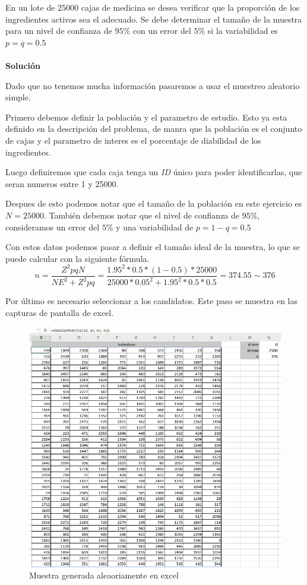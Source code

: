 \documentclass[12pt]{article}
\begin{document}
	\par En un lote de $25000$ cajas de medicina se desea verificar que la proporción de los ingredientes activos sea el adecuado. Se debe determinar el tamaño de la muestra para un nivel de confianza de $95\%$ con un error del $5\%$ si la variabilidad es $p = q = 0.5$
	\ \\\ \\\noindent \textbf{Solución}
	\par Dado que no tenemos mucha informaci\'on pasaremos a usar el muestreo aleatorio simple.
	\par Primero debemos definir la poblaci\'on y el parametro de estudio. Esto ya esta definido en la descripci\'on del problema, de manra que la poblaci\'on es el conjunto de cajas y el parametro de interes es el porcentaje de diabilidad de los ingredientes.
	\par Luego definiremos que cada caja tenga un \textit{ID} \'unico para poder identificarlas, que seran numeros entre 1 y 25000.
	\par Despues de esto podemos notar que el tama\~no de la poblaci\'on en este ejercicio es $N=25000$. Tambi\'en debemos notar que el nivel de confianza de $95\%$, consideramos un error del $5\%$ y una variabilidad de $p = 1-q = 0.5$
	\par Con estos datos podemos pasar a definir el tama\~no ideal de la muestra, lo que se puede calcular con la siguiente f\'ormula.
	$$ n = \frac{Z^2 p q N}{NE^2 + Z^2 p q} = \frac{1.95^2 * 0.5 * (1 - 0.5) * 25000}{25000*0.05^2 + 1.95^2*0.5*0.5} = 374.55 \sim 376 $$
	
	\par Por \'ultimo es necesario seleccionar a los candidatos. Este paso se muestra en las capturas de pantalla de excel.
	
	\begin{figure}[htp]
\centering
\includegraphics[scale=0.6]{muestras.png}
\caption{Muestra generada aleaoriamente en excel}
\label{muestras}
\end{figure}
\end{document}

